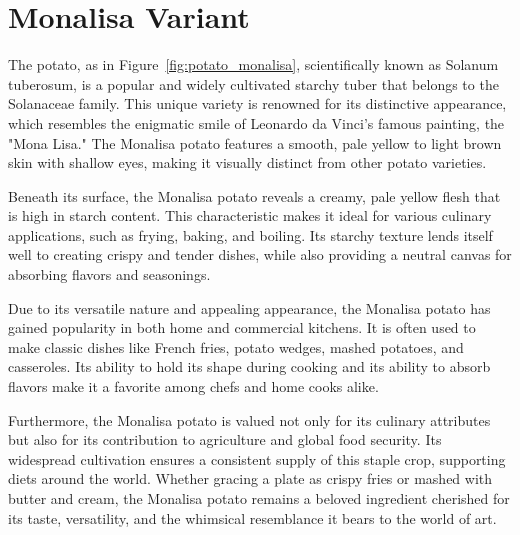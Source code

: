 \documentclass[../../../../main.tex]{subfiles}
\begin{document}

\onlyonsectionfile{
}




\section{Monalisa Variant}


The  potato, as in Figure~\ref{fig:potato_monalisa}, scientifically known as Solanum tuberosum, is a popular and widely cultivated starchy tuber that belongs to the Solanaceae family. This unique variety is renowned for its distinctive appearance, which resembles the enigmatic smile of Leonardo da Vinci's famous painting, the "Mona Lisa." The Monalisa potato features a smooth, pale yellow to light brown skin with shallow eyes, making it visually distinct from other potato varieties.

Beneath its surface, the Monalisa potato reveals a creamy, pale yellow flesh that is high in starch content. This characteristic makes it ideal for various culinary applications, such as frying, baking, and boiling. Its starchy texture lends itself well to creating crispy and tender dishes, while also providing a neutral canvas for absorbing flavors and seasonings.

Due to its versatile nature and appealing appearance, the Monalisa potato has gained popularity in both home and commercial kitchens. It is often used to make classic dishes like French fries, potato wedges, mashed potatoes, and casseroles. Its ability to hold its shape during cooking and its ability to absorb flavors make it a favorite among chefs and home cooks alike.

Furthermore, the Monalisa potato is valued not only for its culinary attributes but also for its contribution to agriculture and global food security. Its widespread cultivation ensures a consistent supply of this staple crop, supporting diets around the world. Whether gracing a plate as crispy fries or mashed with butter and cream, the Monalisa potato remains a beloved ingredient cherished for its taste, versatility, and the whimsical resemblance it bears to the world of art.
\end{document}
